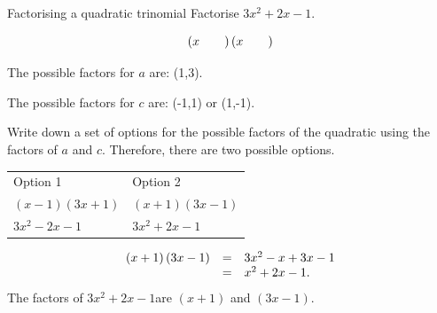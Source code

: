 \begin{wex}
{ 
Factorising a quadratic trinomial 
}
{
Factorise $3{x}^{2}+2x-1$. 
} 
{
\begin{equation}
\left(x\phantom{\rule{2.em}{0ex}}\right)\left(x\phantom{\rule{2.em}{0ex}}\right)
\end{equation}

The possible factors for $a$ are: (1,3).\par
The possible factors for $c$ are: (-1,1) or (1,-1).\par 
\label{m39394*id277075}Write down a set of options for the possible factors of the quadratic using the factors of $a$ and $c$.
Therefore, there are two possible options.\par 
\begin{table}[H]
\begin{center}
\label{m39394*id277097}
\noindent
{}
\tablelasttail{}
\begin{xtabular}[t]{|l|l|}\hline
Option 1 &
Option 2%
\tabularnewline{}
$\left(x-1\right)\left(3x+1\right)$
&
$\left(x+1\right)\left(3x-1\right)$
\tabularnewline{}
$3{x}^{2}-2x-1$
&
\uline{
$3{x}^{2}+2x-1$
}
\tabularnewline{}
\end{xtabular}
\end{center}
\end{table}

\label{m39394*id277257}\nopagebreak\noindent{}

\begin{equation}
\begin{array}{ccl}  
\left(x+1\right)\left(3x-1\right)& =& 3{x}^{2}-x+3x-1\hfill \\ & =& {x}^{2}+2x-1.\end{array}
\end{equation}
\westep{}
\label{m39394*id277481}The factors of $3{x}^{2}+2x-1$\hspace{1ex}are $\left(x+1\right)$ and $\left(3x-1\right)$.

}
\end{wex}

